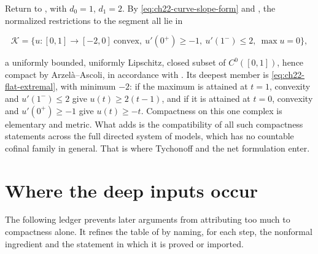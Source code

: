 \begin{example}
\label{ex:ch22-compactness-segment}
Return to , with $d_0=1$, $d_1=2$.  By
\eqref{eq:ch22-curve-slope-form} and
, the normalized restrictions to the
segment all lie in

\[
 \mathcal K=\bigl\{u:[0,1]\to[-2,0]\ \text{convex},\
       u'(0^+)\geq-1,\ u'(1^-)\leq2,\ \max u=0\bigr\},
\]

a uniformly bounded, uniformly Lipschitz, closed subset of
$C^0([0,1])$, hence compact by Arzel\`a--Ascoli, in accordance with
\Cref{cor:ch22-arzela-ascoli}.  Its deepest member is
\eqref{eq:ch22-flat-extremal}, with minimum $-2$: if the maximum is
attained at $t=1$, convexity and $u'(1^-)\leq2$ give
$u(t)\geq2(t-1)$, and if it is attained at $t=0$, convexity and
$u'(0^+)\geq-1$ give $u(t)\geq-t$.  Compactness on
this one complex is elementary and metric.  What
 adds is the compatibility of all such
compactness statements across the full directed system of models, which
has no countable cofinal family in general.  That is
where Tychonoff and the net formulation enter.
\end{example}

\section{Where the deep inputs occur}
\label{sec:ch22-ledger}

The following ledger prevents later arguments from attributing too much to
compactness alone.  It refines the table of
 by naming, for each step, the nonformal
ingredient and the statement in which it is proved or imported.

